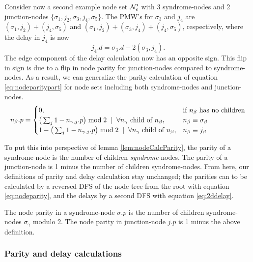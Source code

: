 Consider now a second example node set $\mathcal{N}_e'$ with 3 syndrome-nodes and 2 junction-nodes $\{\sigma_1, j_2, \sigma_3, j_4, \sigma_5\}$. The PMW's for $\sigma_3$ and $j_4$ are $(\sigma_1, j_2) + (j_4, \sigma_5)$ and  $(\sigma_1, j_2) + (\sigma_3, j_4) + (j_4, \sigma_5)$, respectively, where the delay in $j_4$ is now
\begin{equation*}
  j_4.d = \sigma_3.d - 2(\sigma_3, j_4).
\end{equation*}
The edge component of the delay calculation now has an opposite sign. This flip in sign is due to a flip in node parity for junction-nodes compared to syndrome-nodes. As a result, we can generalize the parity calculation of equation \eqref{eq:nodeparitypart} for node sets including both syndrome-nodes and junction-nodes.
\begin{equation}\label{eq:nodeparity}
  n_\beta.p =
  \begin{cases}
    0, & \mbox{if $n_\beta$ has no children}  \\
    \big( \sum_{j} 1-n_{\gamma,j}.p \big ) \bmod 2 \hspace{.2cm} | \hspace{.2cm} \forall n_\gamma \mbox{ child of } n_\beta, & n_\beta \equiv \sigma_\beta \\
    1 - \big( \sum_{j} 1-n_{\gamma,j}.p \big ) \bmod 2 \hspace{.2cm} | \hspace{.2cm} \forall n_\gamma \mbox{ child of } n_\beta, & n_\beta \equiv j_\beta
  \end{cases}
\end{equation}

To put this into perspective of lemma \ref{lem:nodeCalcParity}, the parity of a syndrome-node is the number of children \emph{syndrome}-nodes. The parity of a junction-node is 1 minus the number of children syndrome-nodes. From here, our definitions of parity and delay calculation stay unchanged; the parities can to be calculated by a reversed DFS of the node tree from the root with equation \eqref{eq:nodeparity}, and the delays by a second DFS with equation \eqref{eq:2ddelay}.

\begin{lemma}\label{lem:nodecalc_junction}
  The node parity in a syndrome-node $\sigma.p$ is the number of children syndrome-nodes $\sigma_\gamma$ modulo 2. The node parity in junction-node $j.p$ is 1 minus the above definition.
\end{lemma}

\subsubsection{Parity and delay calculations}

